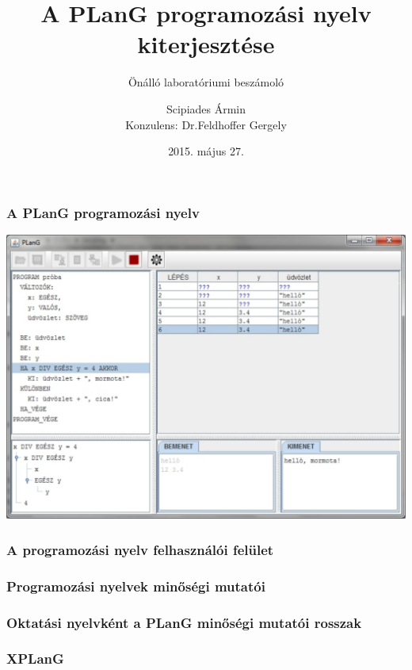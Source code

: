 \documentclass{beamer}
\title{A PLanG programozási nyelv kiterjesztése}
\subtitle{Önálló laboratóriumi beszámoló}
\author{Scipiades Ármin\\\bigskip Konzulens: Dr.\thinspace Feldhoffer Gergely}
\date{2015. május 27.}
\begin{document}
\frame{\titlepage}

\begin{frame}
	\frametitle{A PLanG programozási nyelv}
	\centering
	\includegraphics[width=\linewidth,height=\textheight,keepaspectratio]{images/plang.pdf}
\end{frame}

\begin{frame}
	\frametitle{A programozási nyelv felhasználói felület}	
	\centering
	\begin{adjustbox}{max totalsize={\textwidth}{\textheight},center}
	
	\end{adjustbox}	
\end{frame}

\begin{frame}
	\frametitle{Programozási nyelvek minőségi mutatói}
	\centering
	\begin{adjustbox}{max totalsize={\textwidth}{\textheight},center}
	
	\end{adjustbox}
\end{frame}

\begin{frame}
	\frametitle{Oktatási nyelvként a PLanG minőségi mutatói rosszak}
	\centering
	\begin{adjustbox}{max totalsize={\textwidth}{\textheight},center}
	
	\end{adjustbox}
\end{frame}

\begin{frame}[fragile]
	\frametitle{XPLanG}
	\centering
	\begin{adjustbox}{max totalsize={\textwidth}{\textheight},center}
	
	\end{adjustbox}
\end{frame}

\begin{frame}
	\frametitle{}
\end{frame}
\end{document}
